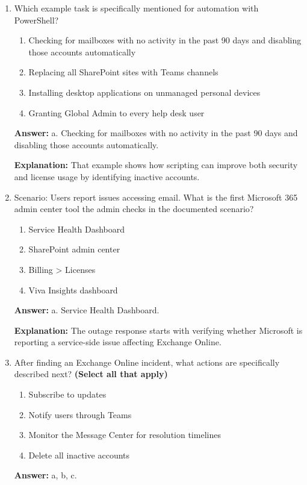 \documentclass[10pt]{article}
\begin{document}
\begin{enumerate}[leftmargin=*]
\textbf{Explanation:} Automation reduces manual effort and allows consistent execution of repeatable administrative processes.

\item Which example task is specifically mentioned for automation with PowerShell?
\begin{enumerate}[label=\alph*., leftmargin=1.5em]
\item Checking for mailboxes with no activity in the past 90 days and disabling those accounts automatically
\item Replacing all SharePoint sites with Teams channels
\item Installing desktop applications on unmanaged personal devices
\item Granting Global Admin to every help desk user
\end{enumerate}
\textbf{Answer:} a. Checking for mailboxes with no activity in the past 90 days and disabling those accounts automatically.

\textbf{Explanation:} That example shows how scripting can improve both security and license usage by identifying inactive accounts.

\item Scenario: Users report issues accessing email. What is the first Microsoft 365 admin center tool the admin checks in the documented scenario?
\begin{enumerate}[label=\alph*., leftmargin=1.5em]
\item Service Health Dashboard
\item SharePoint admin center
\item Billing > Licenses
\item Viva Insights dashboard
\end{enumerate}
\textbf{Answer:} a. Service Health Dashboard.

\textbf{Explanation:} The outage response starts with verifying whether Microsoft is reporting a service-side issue affecting Exchange Online.

\item After finding an Exchange Online incident, what actions are specifically described next? \textbf{(Select all that apply)}
\begin{enumerate}[label=\alph*., leftmargin=1.5em]
\item Subscribe to updates
\item Notify users through Teams
\item Monitor the Message Center for resolution timelines
\item Delete all inactive accounts
\end{enumerate}
\textbf{Answer:} a, b, c.


\end{enumerate}
\end{document}
